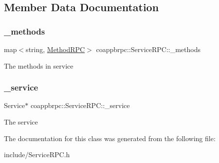 \subsection{Member Data Documentation}
\mbox{\label{classcoappbrpc_1_1ServiceRPC_a78c4046e1763ce1e79d372f8531e3cea}} 
\subsubsection{\texorpdfstring{\+\_\+methods}{\_methods}}
{\footnotesize\ttfamily map$<$string, \hyperlink{classcoappbrpc_1_1MethodRPC}{Method\+R\+PC}$>$ coappbrpc\+::\+Service\+R\+P\+C\+::\+\_\+methods}

The methods in service \mbox{\label{classcoappbrpc_1_1ServiceRPC_a76e56a923f37cdf78b671f912f90ade0}} 
\subsubsection{\texorpdfstring{\+\_\+service}{\_service}}
{\footnotesize\ttfamily Service$\ast$ coappbrpc\+::\+Service\+R\+P\+C\+::\+\_\+service}

The service 

The documentation for this class was generated from the following file\+:\begin{DoxyCompactItemize}
\item 
include/Service\+R\+P\+C.\+h\end{DoxyCompactItemize}
